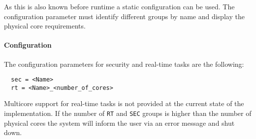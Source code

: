 As this is also known before runtime a static configuration can be used.
The configuration parameter must identify different groups by name
and display the physical core requirements.


\paragraph{Configuration}
The configuration parameters for security and real-time tasks are the
following:
\begin{lstlisting}
  sec = <Name>
  rt = <Name>_<number_of_cores>
\end{lstlisting}

Multicore support for real-time tasks is not provided at the current state of
the implementation.
If the number of \texttt{RT} and \texttt{SEC} groups is higher than the number
of physical cores the system will inform the user via an error message and shut
down.
